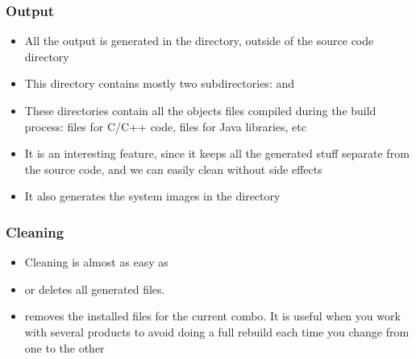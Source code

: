 \begin{frame}
  \frametitle{Output}
  \begin{itemize}
  \item All the output is generated in the
     directory, outside of the source code directory 
  \item This directory contains mostly two subdirectories:
     and 
  \item These directories contain all the objects files compiled
    during the build process:  files for C/C++ code,
     files for Java libraries, etc
  \item It is an interesting feature, since it keeps all the generated
    stuff separate from the source code, and we can easily clean without
    side effects
  \item It also generates the system images in the
     directory
  \end{itemize}
\end{frame}

\begin{frame}
  \frametitle{Cleaning}
  \begin{itemize}
  \item Cleaning is almost as easy as 
  \item {} or  deletes all generated
    files.
  \item {} removes the installed files for the
    current combo. It is useful when you work with several products to
    avoid doing a full rebuild each time you change from one to the
    other
  \end{itemize}
\end{frame}
